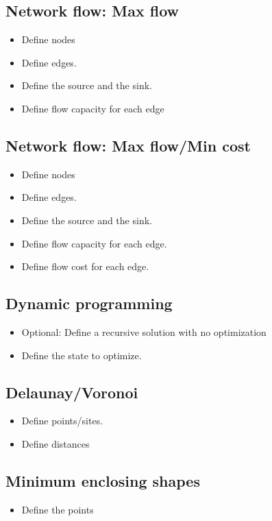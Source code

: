 \documentclass[guide.tex]{subfiles}
\begin{document}
\subsection{Network flow: Max flow}
\begin{itemize}
  \item Define nodes
  \item Define edges.
  \item Define the source and the sink.
  \item Define flow capacity for each edge
\end{itemize}

\subsection{Network flow: Max flow/Min cost}
\begin{itemize}
  \item Define nodes
  \item Define edges.
  \item Define the source and the sink.
  \item Define flow capacity for each edge.
  \item Define flow cost for each edge.
\end{itemize}

\subsection{Dynamic programming}
\begin{itemize}
  \item Optional: Define a recursive solution with no optimization
  \item Define the state to optimize.
\end{itemize}

\subsection{Delaunay/Voronoi}
\begin{itemize}
  \item Define points/sites.
  \item Define distances
\end{itemize}

\subsection{Minimum enclosing shapes}
\begin{itemize}
  \item Define the points
\end{itemize}
\end{document}
